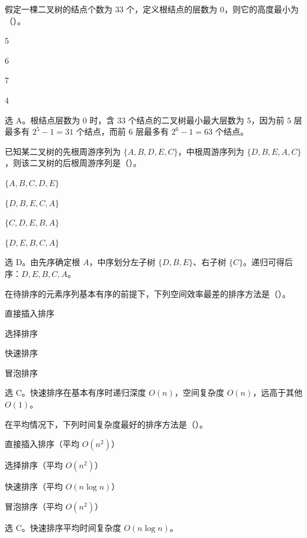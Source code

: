 \begin{question}
假定一棵二叉树的结点个数为 $33$ 个，定义根结点的层数为 $0$，则它的高度最小为（\quad）。
\begin{choiceoptions}[2]
  \item $5$
  \item $6$
  \item $7$
  \item $4$
\end{choiceoptions}
\begin{solution}
选 A。根结点层数为 $0$ 时，含 $33$ 个结点的二叉树最小最大层数为 $5$，因为前 $5$ 层最多有 $2^5-1=31$ 个结点，而前 $6$ 层最多有 $2^6-1=63$ 个结点。
\end{solution}
\end{question}

\begin{question}
已知某二叉树的先根周游序列为 $\{A,B,D,E,C\}$，中根周游序列为 $\{D,B,E,A,C\}$，则该二叉树的后根周游序列是（\quad）。
\begin{choiceoptions}[2]
  \item $\{A,B,C,D,E\}$
  \item $\{D,B,E,C,A\}$
  \item $\{C,D,E,B,A\}$
  \item $\{D,E,B,C,A\}$
\end{choiceoptions}
\begin{solution}
选 D。由先序确定根 $A$，中序划分左子树 $\{D,B,E\}$、右子树 $\{C\}$。递归可得后序：$D,E,B,C,A$。
\end{solution}
\end{question}

\begin{question}
在待排序的元素序列基本有序的前提下，下列空间效率最差的排序方法是（\quad）。
\begin{choiceoptions}[2]
  \item 直接插入排序
  \item 选择排序
  \item 快速排序
  \item 冒泡排序
\end{choiceoptions}
\begin{solution}
选 C。快速排序在基本有序时递归深度 $O(n)$，空间复杂度 $O(n)$，远高于其他 $O(1)$。
\end{solution}
\end{question}

\begin{question}
在平均情况下，下列时间复杂度最好的排序方法是（\quad）。
\begin{choiceoptions}[2]
  \item 直接插入排序（平均 $O(n^2)$）
  \item 选择排序（平均 $O(n^2)$）
  \item 快速排序（平均 $O(n\log n)$）
  \item 冒泡排序（平均 $O(n^2)$）
\end{choiceoptions}
\begin{solution}
选 C。快速排序平均时间复杂度 $O(n\log n)$。
\end{solution}
\end{question}

